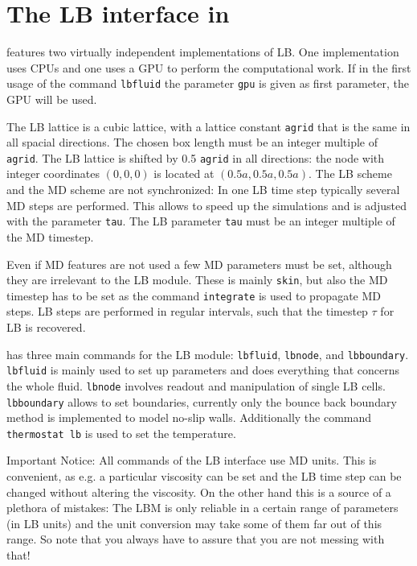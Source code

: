 

\section{The LB interface in \ES{}}
\ES{} features two virtually independent implementations of LB. One implementation
uses CPUs and one uses a GPU to perform the computational work. If in the first usage
of the command { \tt lbfluid} the parameter {\tt gpu} is given as first
parameter, the GPU will be used.

The LB lattice is a cubic lattice, with a lattice constant {\tt agrid} that
is the same in all spacial directions. The chosen box length must be an integer multiple
of {\tt agrid}. The LB lattice is shifted by 0.5 {\tt agrid} in all directions: the node
with integer coordinates $\left(0,0,0\right)$ is located at
$\left(0.5a,0.5a,0.5a\right)$.
The LB scheme and the MD scheme are not synchronized: In one
LB time step typically several MD steps are performed. This allows to speed
up the simulations and is adjusted with the parameter {\tt tau}.
The LB parameter {\tt tau} must be an integer multiple of the MD timestep.

Even if MD features are not used a few MD parameters must be set, although they are irrelevant
to the LB module. These is mainly {\tt skin}, but also the MD timestep has to be
set as the command {\tt integrate} is used to propagate MD steps. LB steps are performed 
in regular intervals, such that the timestep $\tau$ for LB is recovered. 

\ES{} has three main commands for the LB module: 
 {\tt lbfluid},  {\tt lbnode}, and  {\tt lbboundary}.
 {\tt lbfluid} is mainly used to set up parameters and does everything that
concerns the whole fluid.  {\tt lbnode} involves readout and manipulation of
single LB cells.  {\tt lbboundary} allows to set boundaries, currently only
the bounce back boundary method is implemented to model
no-slip walls. Additionally the command  {\tt thermostat lb} is used to set
the temperature. 


Important Notice: All commands of the LB interface use
MD units. This is convenient, as e.g. a particular 
viscosity can be set and the LB time step can be changed without
altering the viscosity. On the other hand this is a source
of a plethora of mistakes: The LBM is only reliable in a certain 
range of parameters (in LB units) and the unit conversion
may take some of them far out of this range. So note that you always
have to assure that you are not messing with that!

